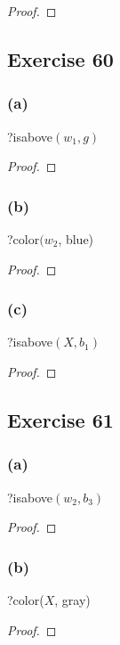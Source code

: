 \documentclass[14pt]{extarticle}
\begin{document}
\begin{proof}

\end{proof}

\subsection{Exercise 60}

\subsubsection{(a)}
?isabove$(w_1, g)$

\begin{proof}

\end{proof}

\subsubsection{(b)}
?color$(w_2$, blue)

\begin{proof}

\end{proof}

\subsubsection{(c)}
?isabove$(X, b_1)$

\begin{proof}

\end{proof}

\subsection{Exercise 61}

\subsubsection{(a)}
?isabove$(w_2, b_3)$

\begin{proof}

\end{proof}

\subsubsection{(b)}
?color($X$, gray)

\begin{proof}

\end{proof}
\end{document}

